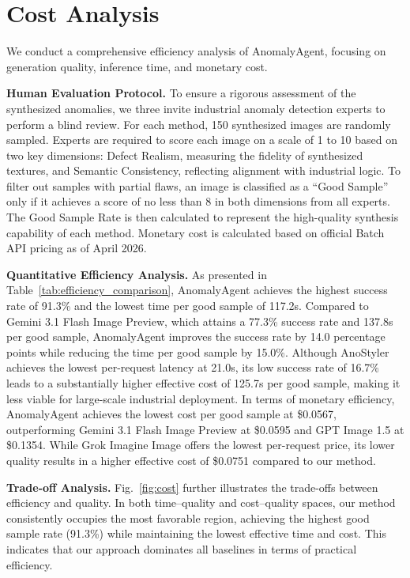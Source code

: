 \documentclass[sigconf]{acmart}
\begin{document}
\noindent\begin{minipage}{\textwidth}

\section{Cost Analysis}

We conduct a comprehensive efficiency analysis of AnomalyAgent, focusing on generation quality, inference time, and monetary cost.

\noindent\textbf{Human Evaluation Protocol.} To ensure a rigorous assessment of the synthesized anomalies, we three invite industrial anomaly detection experts to perform a blind review. For each method, 150 synthesized images are randomly sampled. Experts are required to score each image on a scale of 1 to 10 based on two key dimensions: Defect Realism, measuring the fidelity of synthesized textures, and Semantic Consistency, reflecting alignment with industrial logic. To filter out samples with partial flaws, an image is classified as a ``Good Sample'' only if it achieves a score of no less than 8 in both dimensions from all experts. The Good Sample Rate is then calculated to represent the high-quality synthesis capability of each method. Monetary cost is calculated based on official Batch API pricing as of April 2026.

\noindent\textbf{Quantitative Efficiency Analysis.} As presented in Table~\ref{tab:efficiency_comparison}, AnomalyAgent achieves the highest success rate of 91.3\% and the lowest time per good sample of 117.2s. Compared to Gemini 3.1 Flash Image Preview, which attains a 77.3\% success rate and 137.8s per good sample, AnomalyAgent improves the success rate by 14.0 percentage points while reducing the time per good sample by 15.0\%. Although AnoStyler achieves the lowest per-request latency at 21.0s, its low success rate of 16.7\% leads to a substantially higher effective cost of 125.7s per good sample, making it less viable for large-scale industrial deployment. In terms of monetary efficiency, AnomalyAgent achieves the lowest cost per good sample at \$0.0567, outperforming Gemini 3.1 Flash Image Preview at \$0.0595 and GPT Image 1.5 at \$0.1354. While Grok Imagine Image offers the lowest per-request price, its lower quality results in a higher effective cost of \$0.0751 compared to our method.

\noindent\textbf{Trade-off Analysis.} Fig.~\ref{fig:cost} further illustrates the trade-offs between efficiency and quality. In both time–quality and cost–quality spaces, our method consistently occupies the most favorable region, achieving the highest good sample rate (91.3\%) while maintaining the lowest effective time and cost. This indicates that our approach dominates all baselines in terms of practical efficiency.


\end{minipage}
\end{document}
